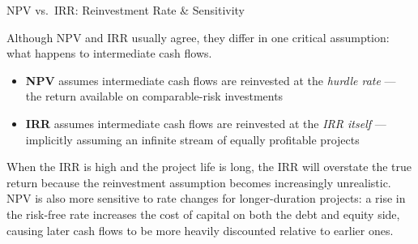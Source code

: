 \documentclass[10pt]{article}
\begin{document}
    \begin{core}{NPV vs.\ IRR: Reinvestment Rate \& Sensitivity}

      Although NPV and IRR usually agree, they differ in one critical assumption: what happens to intermediate cash flows.

      \begin{itemize}

        \item \textbf{NPV} assumes intermediate cash flows are reinvested at the \textit{hurdle rate} — the return available on comparable-risk investments

        \item \textbf{IRR} assumes intermediate cash flows are reinvested at the \textit{IRR itself} — implicitly assuming an infinite stream of equally profitable projects

      \end{itemize}

      When the IRR is high and the project life is long, the IRR will overstate the true return because the reinvestment assumption becomes increasingly unrealistic. NPV is also more sensitive to rate changes for longer-duration projects: a rise in the risk-free rate increases the cost of capital on both the debt and equity side, causing later cash flows to be more heavily discounted relative to earlier ones.


    \end{core}
\end{document}
